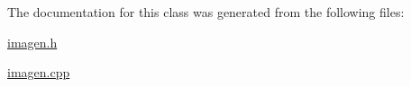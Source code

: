 The documentation for this class was generated from the following files\+:\begin{DoxyCompactItemize}
\item 
\hyperlink{imagen_8h}{imagen.\+h}\item 
\hyperlink{imagen_8cpp}{imagen.\+cpp}\end{DoxyCompactItemize}
